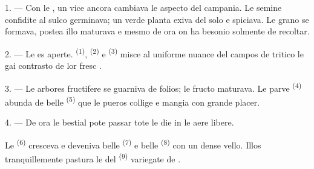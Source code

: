 %


\VUsaut{5.0mm}
\VUsaut{3.0mm}
\VUsaut{3.0mm}
\VUsaut{4.0mm}
\VUsaut{3.0mm}

1. --- Con le , un vice ancora cambiava le aspecto del campania.
Le semine confidite al sulco germinava; un verde planta exiva del solo e
spiciava. Le grano se formava, postea illo maturava e mesmo de ora on ha besonio
solmente de recoltar.

2. --- Le  es aperte. 
\textsuperscript{(1)},  \textsuperscript{(2)} e
 \textsuperscript{(3)} misce al uniforme nuance del campos de
tritico le gai contrasto de lor fresc .

3. --- Le arbores fructifere se guarniva de folios; le fructo maturava. Le parve
 \textsuperscript{(4)} abunda de belle 
\textsuperscript{(5)} que le pueros collige e mangia con grande placer.

4. --- De ora le bestial pote passar tote le die in le aere libere.

Le  \textsuperscript{(6)} cresceva e deveniva belle 
\textsuperscript{(7)} e belle  \textsuperscript{(8)} con un
dense vello. Illos tranquillemente pastura le  del
 \textsuperscript{(9)} variegate de .

